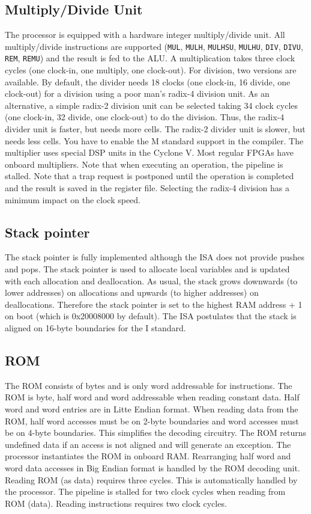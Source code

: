 \documentclass[12pt]{article}
\begin{document}
\subsection{Multiply/Divide Unit}
The processor is equipped with a hardware integer multiply/divide unit. All multiply/divide instructions are supported (\lstinline|MUL|, \lstinline|MULH|, \lstinline|MULHSU|, \lstinline|MULHU|, \lstinline|DIV|, \lstinline|DIVU|, \lstinline|REM|, \lstinline|REMU|) and the result is fed to the ALU. A multiplication takes three clock cycles (one clock-in, one multiply, one clock-out). For division, two versions are available. By default, the divider needs 18 clocks (one clock-in, 16 divide, one clock-out) for a division using a poor man's radix-4 division unit. As an alternative, a simple radix-2 division unit can be selected taking 34 clock cycles (one clock-in, 32 divide, one clock-out) to do the division.  Thus, the radix-4 divider unit is faster, but needs more cells. The radix-2 divider unit is slower, but needs less cells. You have to enable the M standard support in the compiler. The multiplier uses special DSP units in the Cyclone V. Most regular FPGAs have onboard multipliers. Note that when executing an operation, the pipeline is stalled. Note that a trap request is postponed until the operation is completed and the result is saved in the register file. Selecting the radix-4 division has a minimum impact on the clock speed.


\subsection{Stack pointer}
The stack pointer is fully implemented although the ISA does not provide pushes and pops. The stack pointer is used to allocate local variables and is updated with each allocation and deallocation. As usual, the stack grows downwards (to lower addresses) on allocations and upwards (to higher addresses) on deallocations. Therefore the stack pointer is set to the highest RAM address + 1 on boot (which is 0x20008000 by default). The ISA postulates that the stack is aligned on 16-byte boundaries for the I standard.


\subsection{ROM}
\label{sec:rom}
The ROM consists of bytes and is only word addressable for instructions. The ROM is byte, half word and word addressable when reading constant data. Half word and word entries are in Litte Endian format. When reading data from the ROM, half word accesses must be on 2-byte boundaries and word accesses must be on 4-byte boundaries. This simplifies the decoding circuitry. The ROM returns undefined data if an access is not aligned and will generate an exception. The processor instantiates the ROM in onboard RAM. Rearranging half word and word data accesses in Big Endian format is handled by the ROM decoding unit. Reading ROM (as data) requires three cycles.  This is automatically handled by the processor. The pipeline is stalled for two clock cycles when reading from ROM (data). Reading instructions requires two clock cycles.
\end{document}
